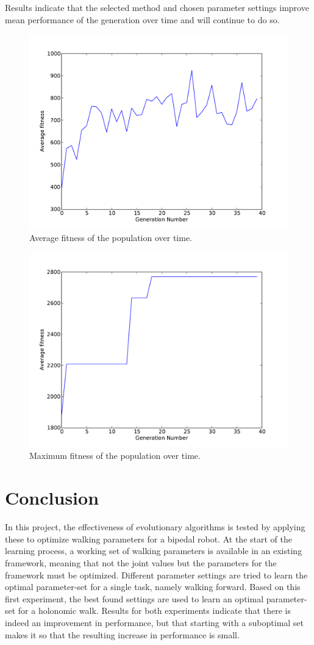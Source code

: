 \documentclass{article}
\begin{document}
Results indicate that the selected method and chosen parameter settings improve mean performance of the generation over time and will continue to do so. 
\begin{figure}[h!]
	\center
	\includegraphics[width=.8\textwidth]{images/fitness}
	\caption{Average fitness of the population over time.}
	\label{fig:avg}
\end{figure}

\begin{figure}[h!]
	\center
	\includegraphics[width=.8\textwidth]{images/max_fitness}
	\caption{Maximum fitness of the population over time.}
	\label{fig:max}
\end{figure}

\section{Conclusion}
In this project, the effectiveness of evolutionary algorithms is tested by
applying these to optimize walking parameters for a bipedal robot. At the start
of the learning process, a working set of walking parameters is available in an
existing framework, meaning that not the joint values but the parameters for
the framework must be optimized. Different parameter settings are tried to
learn the optimal parameter-set for a single task, namely walking forward.
Based on this first experiment, the best found settings are used to learn an
optimal parameter-set for a holonomic walk. Results for both experiments
indicate that there is indeed an improvement in performance, but that starting
with a suboptimal set makes it so that the resulting increase in performance is
small.
\end{document}
